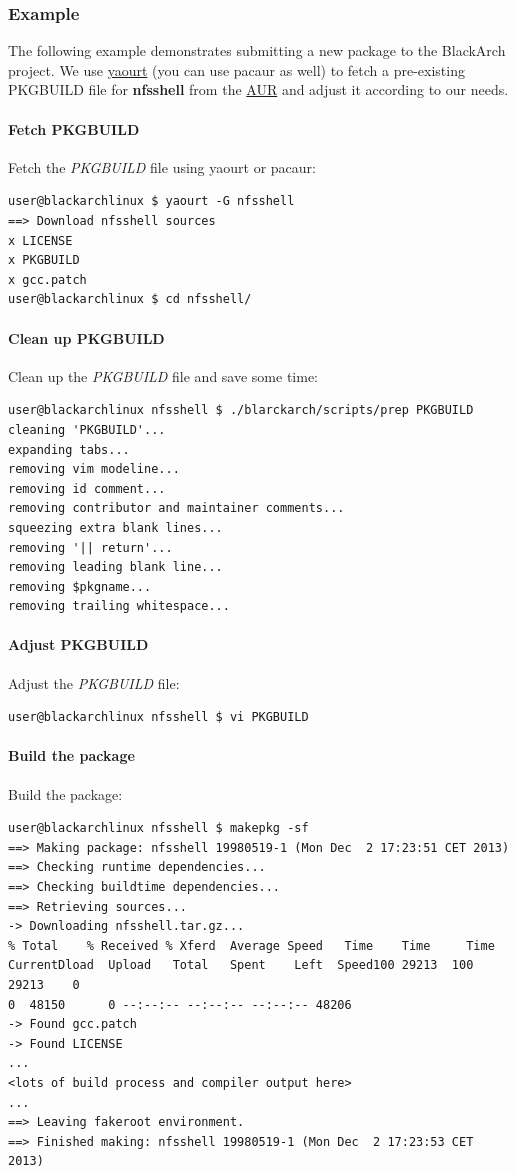 \documentclass[a4paper, twoside, 11pt]{article}
\begin{document}
\subsubsection{Example}
The following example demonstrates submitting a new package to the BlackArch
project. We use \href{https://wiki.archlinux.org/index.php/yaourt}{yaourt}
(you can use pacaur as well) to fetch a pre-existing PKGBUILD file for
\textbf{nfsshell} from the \href{https://aur.archlinux.org/}{AUR} and adjust it
according to our needs.

\paragraph{Fetch PKGBUILD}
Fetch the \textit{PKGBUILD} file using yaourt or pacaur:
{\small
\begin{verbatim}
user@blackarchlinux $ yaourt -G nfsshell
==> Download nfsshell sources
x LICENSE
x PKGBUILD
x gcc.patch
user@blackarchlinux $ cd nfsshell/
\end{verbatim}
}

\paragraph{Clean up PKGBUILD}
Clean up the \textit{PKGBUILD} file and save some time:
{\small
\begin{verbatim}
user@blackarchlinux nfsshell $ ./blarckarch/scripts/prep PKGBUILD
cleaning 'PKGBUILD'...
expanding tabs...
removing vim modeline...
removing id comment...
removing contributor and maintainer comments...
squeezing extra blank lines...
removing '|| return'...
removing leading blank line...
removing $pkgname...
removing trailing whitespace...
\end{verbatim}
}

\paragraph{Adjust PKGBUILD}
Adjust the \textit{PKGBUILD} file:
{\small
\begin{verbatim}
user@blackarchlinux nfsshell $ vi PKGBUILD
\end{verbatim}
}

\paragraph{Build the package}
Build the package:
{\small
\begin{verbatim}
user@blackarchlinux nfsshell $ makepkg -sf
==> Making package: nfsshell 19980519-1 (Mon Dec  2 17:23:51 CET 2013)
==> Checking runtime dependencies...
==> Checking buildtime dependencies...
==> Retrieving sources...
-> Downloading nfsshell.tar.gz...
% Total    % Received % Xferd  Average Speed   Time    Time     Time
CurrentDload  Upload   Total   Spent    Left  Speed100 29213  100 29213    0
0  48150      0 --:--:-- --:--:-- --:--:-- 48206
-> Found gcc.patch
-> Found LICENSE
...
<lots of build process and compiler output here>
...
==> Leaving fakeroot environment.
==> Finished making: nfsshell 19980519-1 (Mon Dec  2 17:23:53 CET 2013)
\end{verbatim}
}
\end{document}

